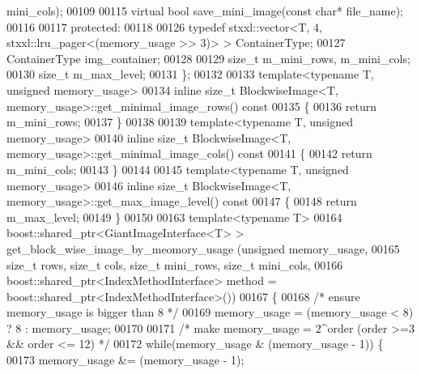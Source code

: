 \begin{DoxyCode}
      mini\_cols);
00109 
00115         \textcolor{keyword}{virtual} \textcolor{keywordtype}{bool} save_mini_image(\textcolor{keyword}{const} \textcolor{keywordtype}{char}* file\_name);
00116 
00117 \textcolor{keyword}{protected}:
00118 
00126         \textcolor{keyword}{typedef} stxxl::vector<T, 4, stxxl::lru\_pager<(memory\_usage >> 3)> >  
      ContainerType;
00127         ContainerType img\_container;
00128 
00129         \textcolor{keywordtype}{size\_t} m\_mini\_rows, m\_mini\_cols;
00130         \textcolor{keywordtype}{size\_t} m\_max\_level;
00131 \};
00132 
00133 \textcolor{keyword}{template}<\textcolor{keyword}{typename} T, \textcolor{keywordtype}{unsigned} memory\_usage>
00134 \textcolor{keyword}{inline} \textcolor{keywordtype}{size\_t} BlockwiseImage<T, memory_usage>::get_minimal_image_rows()\textcolor{keyword}{ const}
00135 \textcolor{keyword}{}\{
00136         \textcolor{keywordflow}{return} m\_mini\_rows;
00137 \}
00138 
00139 \textcolor{keyword}{template}<\textcolor{keyword}{typename} T, \textcolor{keywordtype}{unsigned} memory\_usage>
00140 \textcolor{keyword}{inline} \textcolor{keywordtype}{size\_t} BlockwiseImage<T, memory_usage>::get_minimal_image_cols()\textcolor{keyword}{ const}
00141 \textcolor{keyword}{}\{
00142         \textcolor{keywordflow}{return} m\_mini\_cols;
00143 \}
00144 
00145 \textcolor{keyword}{template}<\textcolor{keyword}{typename} T, \textcolor{keywordtype}{unsigned} memory\_usage>
00146 \textcolor{keyword}{inline} \textcolor{keywordtype}{size\_t} BlockwiseImage<T, memory_usage>::get_max_image_level()\textcolor{keyword}{ const }
00147 \textcolor{keyword}{}\{
00148         \textcolor{keywordflow}{return} m\_max\_level;
00149 \}
00150 
00163 \textcolor{keyword}{template}<\textcolor{keyword}{typename} T>
00164 boost::shared\_ptr<GiantImageInterface<T> > get_block_wise_image_by_meomory_usage
      (\textcolor{keywordtype}{unsigned} memory\_usage,
00165         \textcolor{keywordtype}{size\_t} rows, \textcolor{keywordtype}{size\_t} cols, \textcolor{keywordtype}{size\_t} mini\_rows, \textcolor{keywordtype}{size\_t} mini\_cols, 
00166         boost::shared\_ptr<IndexMethodInterface> method = 
      boost::shared\_ptr<IndexMethodInterface>())
00167 \{
00168         \textcolor{comment}{/* ensure memory\_usage is bigger than 8 */}
00169         memory\_usage = (memory\_usage < 8) ? 8 : memory\_usage;
00170 
00171         \textcolor{comment}{/* make memory\_usage = 2^order (order >=3 && order <= 12) */}
00172         \textcolor{keywordflow}{while}(memory\_usage & (memory\_usage - 1)) \{
00173                 memory\_usage &= (memory\_usage - 1);

\end{DoxyCode}
